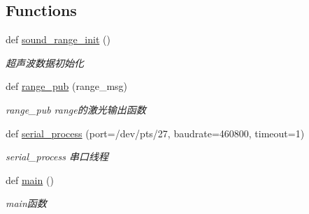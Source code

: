 \subsection*{Functions}
\begin{DoxyCompactItemize}
\item 
def \hyperlink{namespaceserial__af__dox_ad1c876b11fde1e1df850b6ee76536042}{sound\+\_\+range\+\_\+init} ()
\begin{DoxyCompactList}\small\item\em 超声波数据初始化 \end{DoxyCompactList}\item 
def \hyperlink{namespaceserial__af__dox_a8431825ba6486f7d2e0ddfda61a4ae5d}{range\+\_\+pub} (range\+\_\+msg)
\begin{DoxyCompactList}\small\item\em range\+\_\+pub range的激光输出函数 \end{DoxyCompactList}\item 
def \hyperlink{namespaceserial__af__dox_a88369fbec8f4073e79e32dc236e5e282}{serial\+\_\+process} (port=\textquotesingle{}/dev/pts/27\textquotesingle{}, baudrate=460800, timeout=1)
\begin{DoxyCompactList}\small\item\em serial\+\_\+process 串口线程 \end{DoxyCompactList}\item 
def \hyperlink{namespaceserial__af__dox_af39f958509555b34b2cb0bea98981418}{main} ()
\begin{DoxyCompactList}\small\item\em main函数 \end{DoxyCompactList}\end{DoxyCompactItemize}

